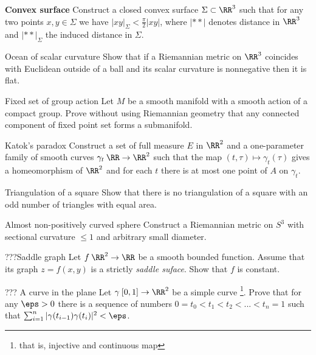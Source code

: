 \begin{pr}{}
{\bf  Convex surface}
Construct a closed convex surface $\Sigma\subset \RR^3$ such that for any two points $x,y\in \Sigma$ we have $|x y|_\Sigma< \frac{\pi}{2}|x y|$, where $|**|$ denotes distance in $\RR^3$ and $|**|_\Sigma$ the induced distance in $\Sigma$.
\end{pr}

\begin{pr}{}{Ocean of scalar curvature} Show that if a Riemannian metric on $\RR^3$ coincides with Euclidean outside of a ball and its scalar curvature is nonnegative then it is flat.
\end{pr}

\begin{pr}{}{Fixed set of group action} Let $M$ be a smooth manifold with a smooth action of a compact group.
Prove without using Riemannian geometry that any connected component of fixed point set forms a submanifold.
\end{pr}

\begin{pr}{\hard}{Katok's paradox}
Construct a set of full measure $E$ in $\RR^2$ and a one-parameter family of smooth curves $\gamma_t\:\RR\to\RR^2$ such that the map $(t,\tau)\mapsto\gamma_t(\tau)$ gives a homeomorphism of $\RR^2$ and for each $t$ there is at most one point of $A$ on $\gamma_t$.
\end{pr}

\begin{pr}{\hard}{Triangulation of a square} 
Show that there is no triangulation of a square with an odd number of triangles with equal area.
\end{pr}

\begin{pr}{\hard}{Almost non-positively curved sphere}  Construct a Riemannian metric on $S^3$ with sectional curvature $\le 1$ and arbitrary small diameter.
\end{pr}

\begin{pr}{}{???Saddle graph}
Let $f\:\RR^2\to\RR$ be a smooth bounded function.
Assume that its graph $z=f(x,y)$ is a strictly \emph{saddle suface}.
Show that $f$ is constant. 
\end{pr}

\begin{pr}{}{??? A curve in the plane}
Let $\gamma\:[0,1]\to \RR^2$ be a simple curve%
\footnote{that is, injective and continuous map}.
Prove that for any $\eps>0$ there is a sequence of numbers
$0=t_0<t_1<t_2<...<t_n=1$ such that
$\sum_{i=1}^n|\gamma(t_{i-1})\gamma(t_{i})|^2<\eps$.
\end{pr}

